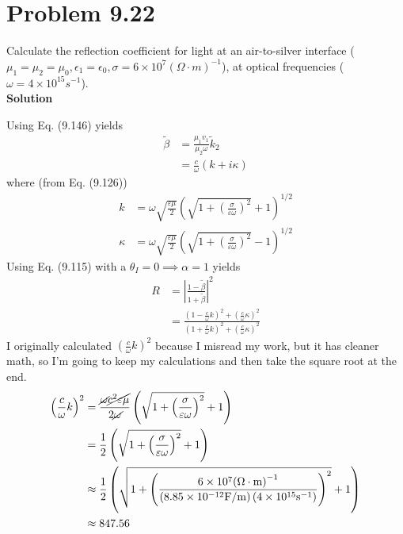 \documentclass[12pt]{article}
\newcommand{\enterProblemHeader}[1]{
	\rhead{#1}
}
\newenvironment{homeworkProblem}[1]{
    \section{Problem #1}
    \enterProblemHeader{#1}
}{
	\pagebreak
}
\newcommand{\solution}{\textbf{\large Solution}}
\begin{document}
\begin{homeworkProblem}{9.22}
	Calculate the reflection coefficient for light at an air-to-silver interface
	($\mu_1 = \mu_2 = \mu_0, \epsilon_1 = \epsilon_0, \sigma = 6 \times 10^7
	(\Omega \cdot \si{m})^{-1}$), at optical frequencies ($\omega = 4 \times
	10^{15} \si{s^{-1}}$).\\

	\solution

	Using Eq. (9.146) yields
	\begin{align*}
		\tilde \beta &= \frac {\mu_1 v_1} {\mu_2 \omega} \tilde k_2 \\
		&= \frac c \omega (k + i \kappa)
	\end{align*}
	where (from Eq. (9.126))
	\begin{align*}
		k &= \omega \sqrt{ \frac {\varepsilon \mu} 2 } \left( \sqrt{1 + \left(
		\frac \sigma {\varepsilon \omega} \right)^2 } + 1 \right)^{1/2}\\
		\kappa &= \omega \sqrt{ \frac {\varepsilon \mu} 2 } \left( \sqrt{1 +
		\left( \frac \sigma {\varepsilon \omega} \right)^2 } - 1 \right)^{1/2}
	\end{align*}
	Using Eq. (9.115) with a $\theta_I = 0 \implies \alpha = 1$ yields
	\begin{align*}
		R &= \left| \frac {1 - \tilde \beta} {1 + \tilde \beta} \right|^2\\
		&= \frac { \left( 1 - \frac c \omega k \right)^2 + \left( \frac c \omega
		\kappa \right)^2 } { \left( 1 + \frac c \omega k \right)^2 + \left(
		\frac c \omega \kappa \right)^2 }
	\end{align*}
	I originally calculated $\left( \frac c \omega k \right)^2$ because I
	misread my work, but it has cleaner math, so I'm going to keep my
	calculations and then take the square root at the end.
	\begin{align*}
		\left( \frac c \omega k \right)^2 &= \frac {\cancel \omega \cancel {c^2
		\varepsilon \mu}} {2 \cancel \omega} \left( \sqrt {1 + \left( \frac
		\sigma {\varepsilon \omega} \right)^2 } + 1 \right)\\
		&= \frac 12 \left( \sqrt{1 + \left( \frac \sigma { \varepsilon \omega }
		\right)^2 } + 1 \right)\\
		&\approx \frac 12 \left( \sqrt{1 + \left( \frac {6 \times 10^7
		\si{(\Omega \cdot m)}^{-1}} {\left(8.85 \times 10^{-12} \si{F/m} \right)
		\left(4 \times 10^{15} \si{s^{-1}}\right)} \right)^2 } + 1 \right)\\
		&\approx 847.56\\

\end{align*}
\end{homeworkProblem}
\end{document}
